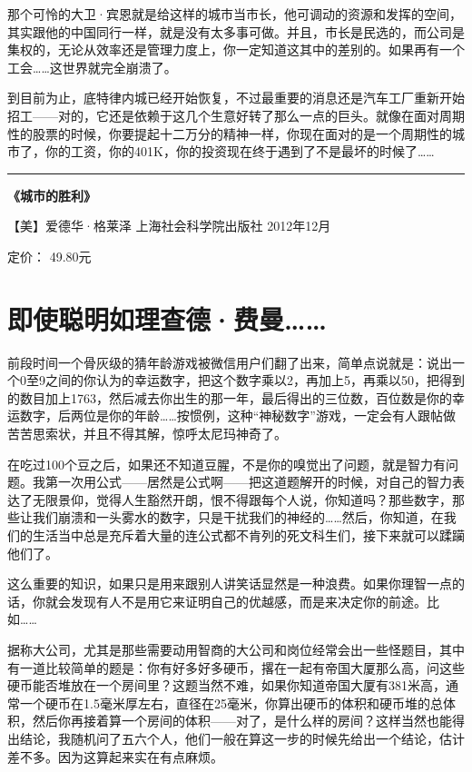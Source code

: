 那个可怜的大卫·宾恩就是给这样的城市当市长，他可调动的资源和发挥的空间，其实跟他的中国同行一样，就是没有太多事可做。并且，市长是民选的，而公司是集权的，无论从效率还是管理力度上，你一定知道这其中的差别的。如果再有一个工会\ldots{}\ldots{}这世界就完全崩溃了。

到目前为止，底特律内城已经开始恢复，不过最重要的消息还是汽车工厂重新开始招工------对的，它还是依赖于这几个生意好转了那么一点的巨头。就像在面对周期
性的股票的时候，你要提起十二万分的精神一样，你现在面对的是一个周期性的城市了，你的工资，你的401K，你的投资现在终于遇到了不是最坏的时候了\ldots{}\ldots{}

\begin{center}\rule{3in}{0.4pt}\end{center}

\textbf{《城市的胜利》}

【美】爱德华·格莱泽 上海社会科学院出版社 2012年12月

定价： 49.80元

\section{即使聪明如理查德·费曼\ldots{}\ldots{}}

前段时间一个骨灰级的猜年龄游戏被微信用户们翻了出来，简单点说就是：说出一个0至9之间的你认为的幸运数字，把这个数字乘以2，再加上5，再乘以50，把得到的数目加上1763，然后减去你出生的那一年，最后得出的三位数，百位数是你的幸运数字，后两位是你的年龄\ldots{}\ldots{}按惯例，这种``神秘数字''游戏，一定会有人跟帖做苦苦思索状，并且不得其解，惊呼太尼玛神奇了。

在吃过100个豆之后，如果还不知道豆腥，不是你的嗅觉出了问题，就是智力有问题。我第一次用公式------居然是公式啊------把这道题解开的时候，对自己的智力表达了无限景仰，觉得人生豁然开朗，恨不得跟每个人说，你知道吗？那些数字，那些让我们崩溃和一头雾水的数字，只是干扰我们的神经的\ldots{}\ldots{}然后，你知道，在我们的生活当中总是充斥着大量的连公式都不肯列的死文科生们，接下来就可以蹂躏他们了。

这么重要的知识，如果只是用来跟别人讲笑话显然是一种浪费。如果你理智一点的话，你就会发现有人不是用它来证明自己的优越感，而是来决定你的前途。比如\ldots{}\ldots{}

据称大公司，尤其是那些需要动用智商的大公司和岗位经常会出一些怪题目，其中有一道比较简单的题是：你有好多好多硬币，撂在一起有帝国大厦那么高，问这些硬币能否堆放在一个房间里？这题当然不难，如果你知道帝国大厦有381米高，通常一个硬币在1.5毫米厚左右，直径在25毫米，你算出硬币的体积和硬币堆的总体积，然后你再接着算一个房间的体积------对了，是什么样的房间？这样当然也能得出结论，我随机问了五六个人，他们一般在算这一步的时候先给出一个结论，估计差不多。因为这算起来实在有点麻烦。

